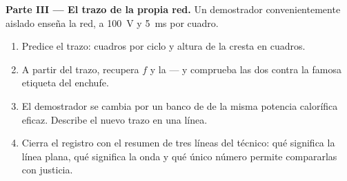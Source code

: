\begin{problem}
\medskip\noindent\textbf{Parte III --- El trazo de la propia red.}
Un demostrador convenientemente aislado enseña la red, a \qty{100}{V} y
\qty{5}{ms} por cuadro.
\begin{enumerate}[resume]
  \item Predice el trazo: cuadros por ciclo y altura de la cresta en
        cuadros.
  \item A partir del trazo, recupera $f$ y la  ---
        y comprueba las dos contra la famosa etiqueta del enchufe.
  \item El demostrador se cambia por un banco de  de la
        misma potencia calorífica eficaz. Describe el nuevo trazo en
        una línea.
  \item Cierra el registro con el resumen de tres líneas del
        técnico: qué significa la línea plana, qué significa la onda
        y qué único número permite compararlas con justicia.
\end{enumerate}
\end{problem}
